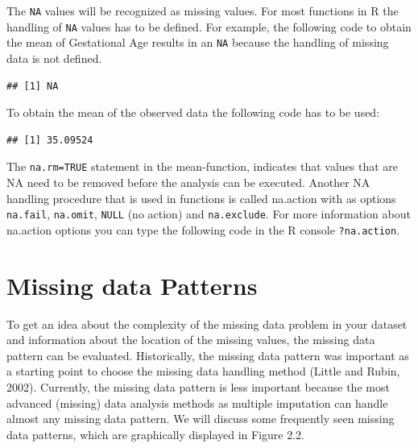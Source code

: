 \documentclass[]{book}
\newenvironment{Shaded}{\begin{snugshade}}{\end{snugshade}}
\newcommand{\KeywordTok}[1]{\textcolor[rgb]{0.13,0.29,0.53}{\textbf{#1}}}
\newcommand{\DataTypeTok}[1]{\textcolor[rgb]{0.13,0.29,0.53}{#1}}
\newcommand{\OtherTok}[1]{\textcolor[rgb]{0.56,0.35,0.01}{#1}}
\newcommand{\OperatorTok}[1]{\textcolor[rgb]{0.81,0.36,0.00}{\textbf{#1}}}
\newcommand{\NormalTok}[1]{#1}
\begin{document}
The \texttt{NA} values will be recognized as missing values. For most
functions in R the handling of \texttt{NA} values has to be defined. For
example, the following code to obtain the mean of Gestational Age
results in an \texttt{NA} because the handling of missing data is not
defined.

\begin{Shaded}
\end{Shaded}

\begin{verbatim}
## [1] NA
\end{verbatim}

To obtain the mean of the observed data the following code has to be
used:

\begin{Shaded}
\end{Shaded}

\begin{verbatim}
## [1] 35.09524
\end{verbatim}

The \texttt{na.rm=TRUE} statement in the mean-function, indicates that
values that are NA need to be removed before the analysis can be
executed. Another NA handling procedure that is used in functions is
called na.action with as options \texttt{na.fail}, \texttt{na.omit},
\texttt{NULL} (no action) and \texttt{na.exclude}. For more information
about na.action options you can type the following code in the R console
\texttt{?na.action}.

\section{Missing data Patterns}\label{missing-data-patterns}

To get an idea about the complexity of the missing data problem in your
dataset and information about the location of the missing values, the
missing data pattern can be evaluated. Historically, the missing data
pattern was important as a starting point to choose the missing data
handling method (Little and Rubin, 2002). Currently, the missing data
pattern is less important because the most advanced (missing) data
analysis methods as multiple imputation can handle almost any missing
data pattern. We will discuss some frequently seen missing data
patterns, which are graphically displayed in Figure 2.2.
\end{document}
